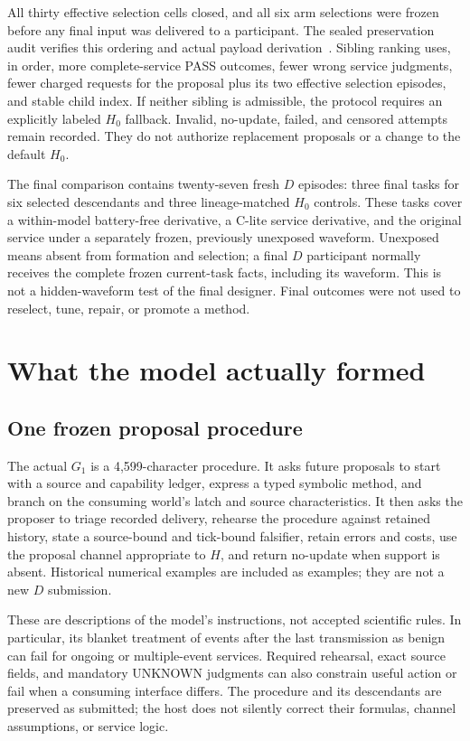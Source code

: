 All thirty effective selection cells closed, and all six arm selections were
frozen before any final input was delivered to a participant. The sealed
preservation audit verifies this ordering and actual payload
derivation~\cite{selection,preservation}. Sibling ranking uses, in order, more complete-service PASS outcomes,
fewer wrong service judgments, fewer charged requests for the proposal plus
its two effective selection episodes, and stable child index. If neither
sibling is admissible, the protocol requires an explicitly labeled $H_0$
fallback. Invalid, no-update, failed, and censored attempts remain recorded.
They do not authorize replacement proposals or a change to the default $H_0$.

The final comparison contains twenty-seven fresh $D$ episodes:
three final tasks for six selected descendants and three lineage-matched
$H_0$ controls. These tasks cover a within-model battery-free derivative, a
C-lite service derivative, and the original service under a separately
frozen, previously unexposed waveform. Unexposed means absent from formation
and selection; a final $D$ participant normally receives the complete frozen
current-task facts, including its waveform. This is not a hidden-waveform
test of the final designer. Final outcomes were not used to reselect, tune,
repair, or promote a method.

\section{What the model actually formed}

\subsection{One frozen proposal procedure}

The actual $G_1$ is a 4,599-character procedure. It asks future proposals to
start with a source and capability ledger, express a typed symbolic method,
and branch on the consuming world's latch and source characteristics. It
then asks the proposer to triage recorded delivery, rehearse the procedure
against retained history, state a source-bound and tick-bound falsifier,
retain errors and costs, use the proposal channel appropriate to $H$, and
return no-update when support is absent. Historical numerical examples are
included as examples; they are not a new $D$ submission.

These are descriptions of the model's instructions, not accepted scientific
rules. In particular, its blanket treatment of events after the last
transmission as benign can fail for ongoing or multiple-event services.
Required rehearsal, exact source fields, and mandatory UNKNOWN judgments can
also constrain useful action or fail when a consuming interface differs.
The procedure and its descendants are preserved as submitted; the host does
not silently correct their formulas, channel assumptions, or service logic.

